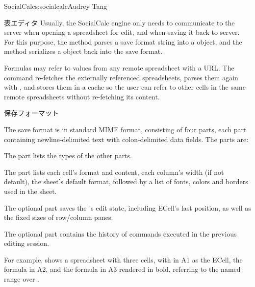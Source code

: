\begin{aosachapter}{SocialCalc}{s:socialcalc}{Audrey Tang}
\begin{aosasect1}{表エディタ}
Usually, the SocialCalc engine only needs to communicate to the server
when opening a spreadsheet for edit, and when saving it back to
server.  For this purpose, the  method
parses a save format string into a  object, and the
 method serializes a  object
back into the save format.

Formulas may refer to values from any remote spreadsheet with a URL.
The  command re-fetches the externally referenced
spreadsheets, parses them again with , and
stores them in a cache so the user can refer to other cells in the
same remote spreadsheets without re-fetching its content.

\end{aosasect1}

\begin{aosasect1}{保存フォーマット}

The save format is in standard MIME  format,
consisting of four  parts, each part
containing newline-delimited text with colon-delimited data fields.
The parts are:

\begin{aosaitemize}

  \item The  part lists the types of the other parts.

  \item The  part lists each cell's format and content, each
  column's width (if not default), the sheet's default format, followed
  by a list of fonts, colors and borders used in the sheet.

  \item The optional  part saves the 's
  edit state, including ECell's last position, as well as the fixed sizes of
  row/column panes.

  \item The optional  part contains the history of
 commands executed in the previous editing session.

\end{aosaitemize}

For example,  shows a spreadsheet with three
cells, with  in A1 as the ECell, the formula 
in A2, and the formula  in A3 rendered in bold,
referring to the named range  over .


\end{aosasect1}
\end{aosachapter}
